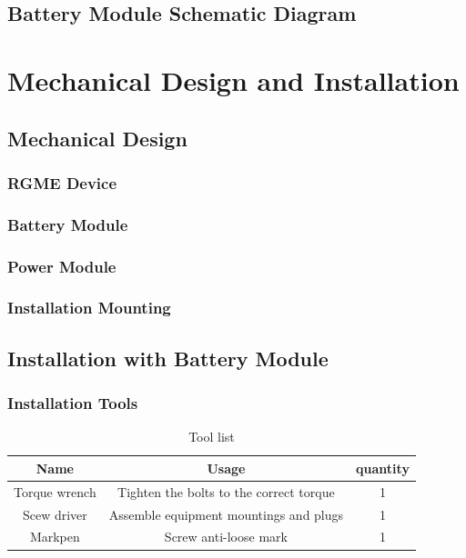 \documentclass{article}
\begin{document}
\subsection{Battery Module Schematic Diagram}

\clearpage
\section{Mechanical Design and Installation}
\subsection{Mechanical Design}
\subsubsection{RGME Device}

\subsubsection{Battery Module}

\subsubsection{Power Module}

\subsubsection{Installation Mounting}

\subsection{Installation with Battery Module}
\subsubsection{Installation Tools}
\begin{table}[htbp] %
    \centering %
    \caption{Tool list} %
    \begin{tabular}{|c|c|c|} 
        \hline
        \toprule 
        Name & Usage & quantity\\
        \midrule %
        Torque wrench & Tighten the bolts to the correct torque & 1 \\ \hline
        Scew driver & Assemble equipment mountings and plugs & 1 \\ \hline
        Markpen & Screw anti-loose mark & 1 \\ \hline
        \bottomrule %
    \end{tabular}
  \end{table}
\end{document}
